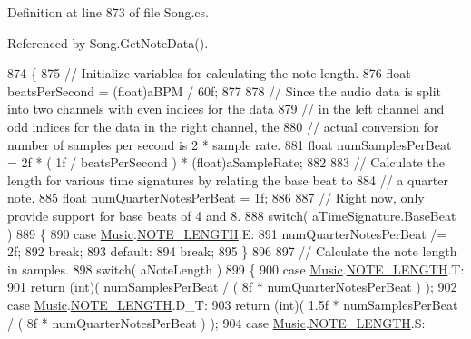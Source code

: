 Definition at line 873 of file Song.\+cs.



Referenced by Song.\+Get\+Note\+Data().


\begin{DoxyCode}
874     \{
875         \textcolor{comment}{// Initialize variables for calculating the note length.}
876         \textcolor{keywordtype}{float} beatsPerSecond = (float)aBPM / 60f;
877 
878         \textcolor{comment}{// Since the audio data is split into two channels with even indices for the data }
879         \textcolor{comment}{// in the left channel and odd indices for the data in the right channel, the}
880         \textcolor{comment}{// actual conversion for number of samples per second is 2 * sample rate.}
881         \textcolor{keywordtype}{float} numSamplesPerBeat = 2f * ( 1f / beatsPerSecond ) * (\textcolor{keywordtype}{float})aSampleRate;
882 
883         \textcolor{comment}{// Calculate the length for various time signatures by relating the base beat to }
884         \textcolor{comment}{// a quarter note. }
885         \textcolor{keywordtype}{float} numQuarterNotesPerBeat = 1f;
886 
887         \textcolor{comment}{// Right now, only provide support for base beats of 4 and 8.}
888         \textcolor{keywordflow}{switch}( aTimeSignature.BaseBeat )
889         \{
890             \textcolor{keywordflow}{case} \hyperlink{class_music}{Music}.\hyperlink{group___music_enums_gaf11b5f079adbb21c800b9eca1c5c3cbd}{NOTE\_LENGTH}.E:
891                 numQuarterNotesPerBeat /= 2f;
892                 \textcolor{keywordflow}{break};
893             \textcolor{keywordflow}{default}:
894                 \textcolor{keywordflow}{break};
895         \}
896 
897         \textcolor{comment}{// Calculate the note length in samples.}
898         \textcolor{keywordflow}{switch}( aNoteLength )
899         \{
900             \textcolor{keywordflow}{case} \hyperlink{class_music}{Music}.\hyperlink{group___music_enums_gaf11b5f079adbb21c800b9eca1c5c3cbd}{NOTE\_LENGTH}.T:
901                 \textcolor{keywordflow}{return} (\textcolor{keywordtype}{int})( numSamplesPerBeat / ( 8f * numQuarterNotesPerBeat ) );
902             \textcolor{keywordflow}{case} \hyperlink{class_music}{Music}.\hyperlink{group___music_enums_gaf11b5f079adbb21c800b9eca1c5c3cbd}{NOTE\_LENGTH}.D\_T:
903                 \textcolor{keywordflow}{return} (\textcolor{keywordtype}{int})( 1.5f * numSamplesPerBeat / ( 8f * numQuarterNotesPerBeat ) );
904             \textcolor{keywordflow}{case} \hyperlink{class_music}{Music}.\hyperlink{group___music_enums_gaf11b5f079adbb21c800b9eca1c5c3cbd}{NOTE\_LENGTH}.S:

\end{DoxyCode}
